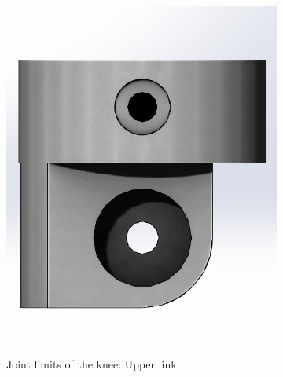 \begin{figure}[ht!]
    \ContinuedFloat %
    \centering
    \begin{subfigure}[b]{0.35\textwidth}
        \includegraphics[width=\textwidth]{figures/joint_limits_knee_upper.PNG}
        \caption{Joint limits of the knee: Upper link.}
        \label{fig:joint_limits_knee_upper}
    \end{subfigure}
    \begin{subfigure}[b]{0.35\textwidth}

\end{subfigure}
\end{figure}
